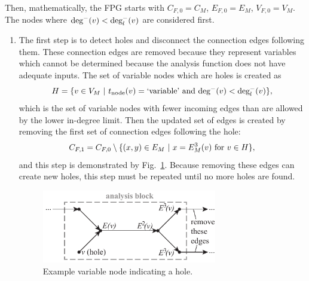 	Then, mathematically, the FPG starts with $C_{F,0} = C_M$, $E_{F,0} = E_M$, $V_{F,0} = V_M$.
	The nodes where $\textrm{deg}^-(v) < \textrm{deg}_l^-(v)$ are considered first.
	\begin{enumerate}
	\item The first step is to detect holes and disconnect the connection edges following them. These connection edges are removed because they represent variables which cannot be determined because the analysis function does not have adequate inputs. The set of variable nodes which are holes is created as
	\begin{equation}
	H = \{v \in V_M \ | \  t_\textrm{node}(v) = \textrm{`variable'} \textrm{ and } \textrm{deg}^-(v) < \textrm{deg}_l^-(v) \},
	\end{equation}
	which is the set of variable nodes with fewer incoming edges than are allowed by the lower in-degree limit.
	Then the updated set of edges is created by removing the first set of connection edges following the hole:
	\begin{equation}
	C_{F,1} = C_{F,0} \setminus \{(x,y) \in E_M \ | \  x=E_M^3(v) \textrm{ for } v \in H\},
	\end{equation}
	and this step is demonstrated by Fig.~\ref{f:hole}. Because removing these edges can create new holes, this step must be repeated until no more holes are found.
	\begin{figure}[htb!]
		\begin{center}
		\includegraphics[width=3in]{images/analysis_block_hole}
		\end{center}
		\vspace{-20pt}
	\caption{Example variable node indicating a hole.}
	\label{f:hole}
	\end{figure}


\end{enumerate}
